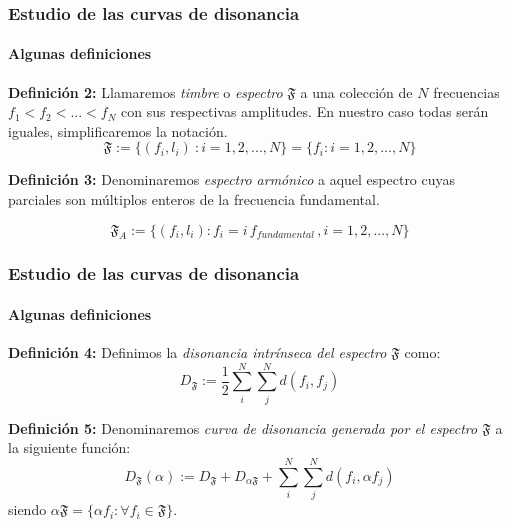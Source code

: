 \documentclass[12 pt]{beamer}
\begin{document}
\begin{frame}{17}
    \frametitle{Estudio de las curvas de disonancia}
    
    \framesubtitle{Algunas definiciones}
    
    \textbf{Definición 2:} Llamaremos \emph{timbre} o \emph{espectro} $\mathfrak{F}$ a una colección de $N$ frecuencias $f_1 < f_2 < ... < f_N$ con sus respectivas amplitudes. En nuestro caso todas serán iguales, simplificaremos la notación.
    \begin{equation*}
        \mathfrak{F} := \{ (f_i, l_i)\ : i = 1,2,..., N\} = \{ f_i : i = 1,2, ..., N\}  
    \end{equation*}
    
    \textbf{Definición 3:} Denominaremos \emph{espectro armónico} a aquel espectro cuyas parciales son múltiplos enteros de la frecuencia fundamental.
    
    \begin{equation*}
       \mathfrak{F}_{A} := \{ (f_i, l_i) : f_i = i\,f_{fundamental}\,, i =1, 2, ..., N   \}
    \end{equation*}
    
\end{frame}

\begin{frame}{18}
    \frametitle{Estudio de las curvas de disonancia}
    
    \framesubtitle{Algunas definiciones}
    
    
    \textbf{Definición 4:} Definimos la \emph{disonancia intrínseca del espectro $\mathfrak{F}$}  como:
    \begin{equation*}
        D_{\mathfrak{F}} := \frac{1}{2} \sum_{i}^{N} \sum_{j}^{N} d(f_i, f_j)
    \end{equation*}
    
    \textbf{Definición 5:} Denominaremos \emph{curva de disonancia generada por el espectro $\mathfrak{F}$} a la siguiente función:
    \begin{equation*}
        \boxed{
            D_{\mathfrak{F}} (\alpha) := D_{\mathfrak{F}} + D_{\mathfrak{\alpha F}} + \sum_{i}^{N} \sum_{j}^{N} d(f_i, \alpha f_j)
        }
    \end{equation*}
   siendo $\alpha \mathfrak{F} = \{ \alpha f_i : \forall f_i \in \mathfrak{F}\}$.
\end{frame}
\end{document}
